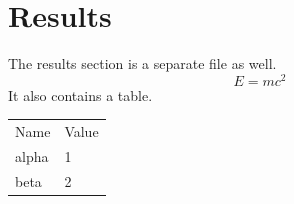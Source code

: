 \section{Results}
The results section is a separate file as well.
\begin{equation}
  E = m c^2
\end{equation}
It also contains a table.

\begin{center}
\begin{tabular}{ll}
  Name & Value \\
  alpha & 1 \\
  beta & 2 \\
\end{tabular}
\end{center}


